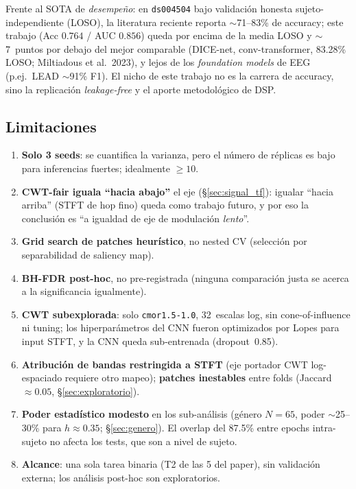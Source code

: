\documentclass[11pt, a4paper]{article}
\begin{document}
Frente al SOTA de \emph{desempeño}: en \texttt{ds004504} bajo validación
honesta sujeto-independiente (LOSO), la literatura reciente reporta
$\sim$71--83\% de accuracy; este trabajo (Acc $0.764$ / AUC $0.856$) queda
por encima de la media LOSO y $\sim$7~puntos por debajo del mejor comparable
(DICE-net, conv-transformer, 83.28\% LOSO; Miltiadous et al.~2023), y lejos
de los \emph{foundation models} de EEG (p.ej.\ LEAD $\sim$91\% F1). El nicho
de este trabajo no es la carrera de accuracy, sino la replicación
\emph{leakage-free} y el aporte metodológico de DSP.

\subsection{Limitaciones}
\label{sec:limitaciones}

\begin{enumerate}[leftmargin=*]
    \item \textbf{Solo 3 seeds}: se cuantifica la varianza, pero el número
    de réplicas es bajo para inferencias fuertes; idealmente $\geq10$.
    \item \textbf{CWT-fair iguala ``hacia abajo''} el eje
    (§\ref{sec:signal_tf}): igualar ``hacia arriba'' (STFT de hop fino) queda
    como trabajo futuro, y por eso la conclusión es ``a igualdad de eje de
    modulación \emph{lento}''.
    \item \textbf{Grid search de patches heurístico}, no nested CV
    (selección por separabilidad de saliency map).
    \item \textbf{BH-FDR post-hoc}, no pre-registrada (ninguna comparación
    justa se acerca a la significancia igualmente).
    \item \textbf{CWT subexplorada}: solo \texttt{cmor1.5-1.0}, 32~escalas
    log, sin cone-of-influence ni tuning; los hiperparámetros del CNN fueron
    optimizados por Lopes para input STFT, y la CNN queda sub-entrenada
    (dropout~0.85).
    \item \textbf{Atribución de bandas restringida a STFT} (eje portador CWT
    log-espaciado requiere otro mapeo); \textbf{patches inestables} entre
    folds (Jaccard~$\approx0.05$, §\ref{sec:exploratorio}).
    \item \textbf{Poder estadístico modesto} en los sub-análisis (género
    $N=65$, poder $\sim$25--30\% para $h\approx0.35$;
    §\ref{sec:genero}). El overlap del 87.5\% entre epochs intra-sujeto no
    afecta los tests, que son a nivel de sujeto.
    \item \textbf{Alcance}: una sola tarea binaria (T2 de las 5 del paper),
    sin validación externa; los análisis post-hoc son exploratorios.
\end{enumerate}
\end{document}
